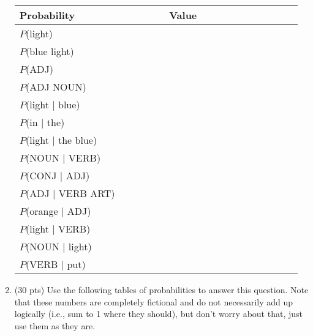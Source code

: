 \documentclass[11pt]{article}
\begin{document}
\begin{enumerate}
 \begin{center}
 \begin{tabular}{|l|l|} \hline
 \textbf{Probability~~~~~~~~~~~~~~~} & \textbf{Value~~~~~~~~~~~~~~~~~} \\ \hline
 $P$(light) & ~ \\ \hline
 $P$(blue light) & ~ \\ \hline
 $P$(ADJ) & \\ \hline
 $P$(ADJ NOUN) & ~ \\ \hline
 $P$(light $\mid$ blue) & ~ \\ \hline
 $P$(in $\mid$ the) & ~ \\ \hline
 $P$(light $\mid$ the blue) & ~ \\ \hline
 $P$(NOUN $\mid$ VERB) & ~ \\ \hline
 $P$(CONJ $\mid$ ADJ) & ~ \\ \hline
 $P$(ADJ $\mid$ VERB ART) & ~ \\ \hline
 $P$(orange $\mid$ ADJ) & ~ \\  \hline
 $P$(light $\mid$ VERB) & ~ \\ \hline
 $P$(NOUN $\mid$ light) & ~ \\ \hline
 $P$(VERB $\mid$ put) & ~ \\ \hline
 \end{tabular}
 \end{center}





\newpage

\item (30 pts) Use the following tables of probabilities 
to answer this question. Note that these numbers are completely
fictional and do not necessarily add up logically (i.e., sum to 1
where they should), but don't worry about that, just use them as they
are. 



\end{enumerate}
\end{document}
